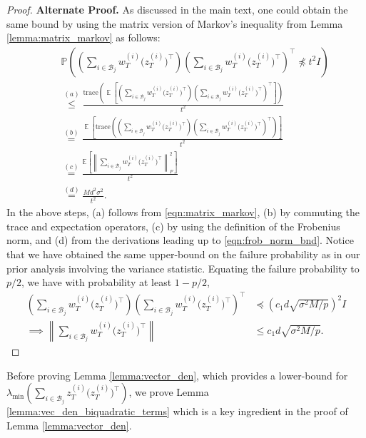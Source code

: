 \documentclass[letterpaper, 11 pt]{article}
\newcommand{\mc}{\mathcal}
\newcommand{\normlr}[1]{\left\lVert#1\right\rVert}
\newcommand{\tr}[1]{\text{trace}\left( #1 \right)}
\DeclareMathOperator{\E}{\mathbb{E}}
\begin{document}
\begin{proof}
    \textbf{Alternate Proof.} As discussed in the main text, one could obtain the same bound by using the matrix version of Markov's inequality from Lemma \ref{lemma:matrix_markov} as follows:
    \begin{align*}
        & \mathbb{P}\left( \left(\sum_{i \in \mc{B}_j} w_T^{(i)}\big(z_T^{(i)}\big)^{\top}\right) \left(\sum_{i \in \mc{B}_j} w_T^{(i)}\big(z_T^{(i)}\big)^{\top}\right)^{\top} \not \preceq t^2 I \right) \\
        \quad & \overset{(a)}{\leq} \frac{\tr{\E\left[ \left(\sum_{i \in \mc{B}_j} w_T^{(i)}\big(z_T^{(i)}\big)^{\top}\right) \left(\sum_{i \in \mc{B}_j} w_T^{(i)}\big(z_T^{(i)}\big)^{\top}\right)^{\top}\right]}}{t^2} \\
        & \overset{(b)}{=} \frac{\E\left[ \tr{\left(\sum_{i \in \mc{B}_j} w_T^{(i)}\big(z_T^{(i)}\big)^{\top}\right) \left(\sum_{i \in \mc{B}_j} w_T^{(i)}\big(z_T^{(i)}\big)^{\top}\right)^{\top}}\right]}{t^2} \\
        & \overset{(c)}{=} \frac{\mathbb{E}\left[ \normlr{\sum_{i \in \mc{B}_j} w_T^{(i)}\big(z_T^{(i)}\big)^{\top}}_F^2\right]}{t^2} \\
        & \overset{(d)}{=} \frac{M d^2 \sigma^2}{t^2}.
    \end{align*}
    In the above steps, (a) follows from \eqref{eqn:matrix_markov}, (b) by commuting the trace and expectation operators, (c) by using the definition of the Frobenius norm, and (d) from the derivations leading up to \eqref{eqn:frob_norm_bnd}. Notice that we have obtained the same upper-bound on the failure probability as in our prior analysis involving the variance statistic. Equating the failure probability to $p/2$, we have with probability at least $1 - p/2$, 
    \begin{align*}
        \left(\sum_{i \in \mc{B}_j} w_T^{(i)}\big(z_T^{(i)}\big)^{\top}\right) \left(\sum_{i \in \mc{B}_j} w_T^{(i)}\big(z_T^{(i)}\big)^{\top}\right)^{\top} &\preceq \left(c_1d \sqrt{\sigma^2 M/p}\right)^2 I \\
        \implies \normlr{\sum_{i \in \mc{B}_j} w_T^{(i)}\big(z_T^{(i)}\big)^{\top}} & \leq c_1 d \sqrt{\sigma^2 M/p}.
    \end{align*}
    
\end{proof}

Before proving Lemma \ref{lemma:vector_den}, which provides a lower-bound for $\lambda_{\min}{\left(\sum_{i \in \mc{B}_j} z_T^{(i)}\big(z_T^{(i)}\big)^{\top}\right)}$, we prove Lemma \ref{lemma:vec_den_biquadratic_terms} which is a key ingredient in the proof of Lemma \ref{lemma:vector_den}.
\end{document}

